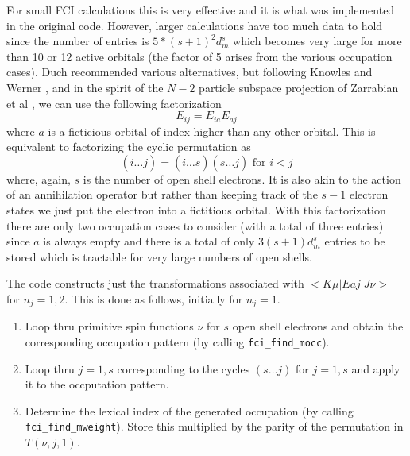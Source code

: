 For small FCI calculations this is very effective and it is what was
implemented in the original code. However, larger calculations have
too much data to hold since the number of entries is $5*(s+1)^2d^s_m$
which becomes very large for more than 10 or 12 active orbitals (the
factor of 5 arises from the various occupation cases).  Duch
recommended various alternatives, but following Knowles and Werner
\cite{knowleseai}, and in the spirit of the $N-2$ particle subspace
projection of Zarrabian et al \cite{zarrabian,harrison}, we can use the
following factorization
\begin{equation}
 E_{ij} = E_{ia}E_{aj}
\end{equation}
where $a$ is a ficticious orbital of index higher than any other
orbital.  This is equivalent to factorizing the cyclic permutation as 
\begin{equation}
(\overline{i} \ldots \overline{j}) = (\overline{i} \ldots s)(s \ldots
\overline{j}) \mbox{\ for\ } i < j
\end{equation}
where, again, $s$ is the number of open shell electrons.  It is also
akin to the action of an annihilation operator but rather than keeping
track of the $s-1$ electron states we just put the electron into a
fictitious orbital.  With this factorization there are only two
occupation cases to consider (with a total of three entries) since $a$
is always empty and there is a total of only $3(s+1)d^s_m$ entries to
be stored which is tractable for very large numbers of open shells.

The code constructs just the transformations associated with $<\!
K\mu|Eaj|J\nu\! >$ for $n_j=1,2$.  This is done as follows, initially
for $n_j = 1$.
\begin{enumerate}
\item Loop thru primitive spin functions $\nu$ for $s$ open shell
electrons and obtain the corresponding occupation pattern (by calling
\verb+fci_find_mocc+).

\item Loop thru $j=1,s$ corresponding to the cycles $(s \ldots j)$ for
$j=1,s$ and apply it to the occputation pattern.

\item Determine the lexical index of the generated occupation (by
calling \verb+fci_find_mweight+).  Store this multiplied by the parity
of the permutation in $T(\nu,j,1)$.
\end{enumerate}

